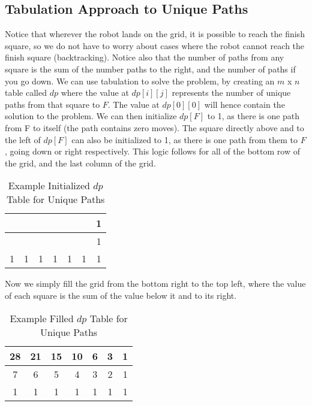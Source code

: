 \subsection*{Tabulation Approach to Unique Paths}
Notice that wherever the robot lands on the grid, it is possible to reach the finish square,
so we do not have to worry about cases where the robot cannot reach the finish square (backtracking).
Notice also that the number of paths from any square is the sum of the number paths to the right, and the number of paths if you go down.
We can use tabulation to solve the problem, by creating an $m$ x $n$ table called $dp$ where the value at $dp[i][j]$ represents the number of unique paths from that square to $F$.
The value at $dp[0][0]$ will hence contain the solution to the problem.
We can then initialize $dp[F]$ to 1, as there is one path from F to itself (the path contains zero moves).
The square directly above and to the left of $dp[F]$ can also be initialized to 1, as there is one path from them to $F$, going down or right respectively. This logic follows for all of the bottom row of the grid, and the last column of the grid.

\begin{table}[H]
    \centering
    \begin{tabular}{|c|c|c|c|c|c|c|}
        \hline
         &  &  &  &  &  & 1 \\
        \hline
         &  &  &  &  &  & 1 \\
        \hline
        1 & 1 & 1 & 1 & 1 & 1 & 1 \\
        \hline
    \end{tabular}
    \caption{Example Initialized $dp$ Table for Unique Paths}
\end{table}

Now we simply fill the grid from the bottom right to the top left,
where the value of each square is the sum of the value below it and to its right.

\begin{table}[H]
    \centering
    \begin{tabular}{|c|c|c|c|c|c|c|}
        \hline
        28 & 21 & 15 & 10 & 6 & 3 & 1 \\
        \hline
        7 & 6 & 5 & 4 & 3 & 2 & 1 \\
        \hline
        1 & 1 & 1 & 1 & 1 & 1 & 1 \\
        \hline
    \end{tabular}
    \caption{Example Filled $dp$ Table for Unique Paths}
\end{table}

